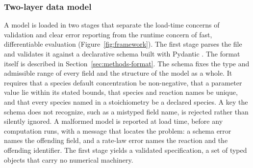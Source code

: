 \documentclass{article}
\begin{document}
\subsubsection{Two-layer data model}
\label{sec:methods-twolayer}

A model is loaded in two stages that separate the load-time concerns of validation and clear error reporting from the runtime concern of fast, differentiable evaluation (Figure~\ref{fig:framework}). The first stage parses the file and validates it against a declarative schema built with Pydantic \citep{Colvin_Pydantic_Validation_2026}. The format itself is described in Section~\ref{sec:methods-format}. The schema fixes the type and admissible range of every field and the structure of the model as a whole. It requires that a species default concentration be non-negative, that a parameter value lie within its stated bounds, that species and reaction names be unique, and that every species named in a stoichiometry be a declared species. A key the schema does not recognize, such as a mistyped field name, is rejected rather than silently ignored. A malformed model is reported at load time, before any computation runs, with a message that locates the problem: a schema error names the offending field, and a rate-law error names the reaction and the offending identifier. The first stage yields a validated specification, a set of typed objects that carry no numerical machinery.
\end{document}
